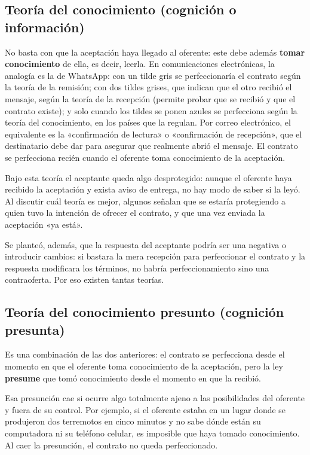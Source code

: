 \documentclass[12pt,oneside]{book}
\begin{document}
\subsection{Teoría del conocimiento (cognición o información)}

No basta con que la aceptación haya llegado al oferente: este debe además \textbf{tomar conocimiento} de ella, es decir, leerla. En comunicaciones electrónicas, la analogía es la de WhatsApp: con un tilde gris se perfeccionaría el contrato según la teoría de la remisión; con dos tildes grises, que indican que el otro recibió el mensaje, según la teoría de la recepción (permite probar que se recibió y que el contrato existe); y solo cuando los tildes se ponen azules se perfecciona según la teoría del conocimiento, en los países que la regulan. Por correo electrónico, el equivalente es la «confirmación de lectura» o «confirmación de recepción», que el destinatario debe dar para asegurar que realmente abrió el mensaje. El contrato se perfecciona recién cuando el oferente toma conocimiento de la aceptación.

Bajo esta teoría el aceptante queda algo desprotegido: aunque el oferente haya recibido la aceptación y exista aviso de entrega, no hay modo de saber si la leyó. Al discutir cuál teoría es mejor, algunos señalan que se estaría protegiendo a quien tuvo la intención de ofrecer el contrato, y que una vez enviada la aceptación «ya está».

Se planteó, además, que la respuesta del aceptante podría ser una negativa o introducir cambios: si bastara la mera recepción para perfeccionar el contrato y la respuesta modificara los términos, no habría perfeccionamiento sino una contraoferta. Por eso existen tantas teorías.


\subsection{Teoría del conocimiento presunto (cognición presunta)}

Es una combinación de las dos anteriores: el contrato se perfecciona desde el momento en que el oferente toma conocimiento de la aceptación, pero la ley \textbf{presume} que tomó conocimiento desde el momento en que la recibió.

Esa presunción cae si ocurre algo totalmente ajeno a las posibilidades del oferente y fuera de su control. Por ejemplo, si el oferente estaba en un lugar donde se produjeron dos terremotos en cinco minutos y no sabe dónde están su computadora ni su teléfono celular, es imposible que haya tomado conocimiento. Al caer la presunción, el contrato no queda perfeccionado.
\end{document}

